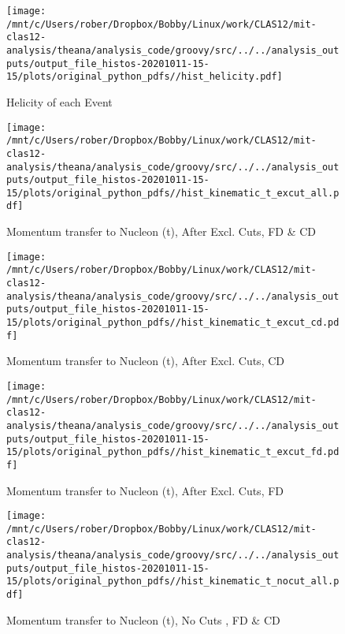 \documentclass{article}
\begin{document}
\begin{landscape}
    \begin{figure}[h]
        \centering

        \texttt{[image: /mnt/c/Users/rober/Dropbox/Bobby/Linux/work/CLAS12/mit-clas12-analysis/theana/analysis\_code/groovy/src/../../analysis\_outputs/output\_file\_histos-20201011-15-15/plots/original\_python\_pdfs//hist\_helicity.pdf]}
        \captionsetup{textformat=empty,labelformat=blank}
        \caption{Helicity of each Event}
    \end{figure}
    \clearpage
    
    \begin{figure}[h]
        \centering

        \texttt{[image: /mnt/c/Users/rober/Dropbox/Bobby/Linux/work/CLAS12/mit-clas12-analysis/theana/analysis\_code/groovy/src/../../analysis\_outputs/output\_file\_histos-20201011-15-15/plots/original\_python\_pdfs//hist\_kinematic\_t\_excut\_all.pdf]}
        \captionsetup{textformat=empty,labelformat=blank}
        \caption{Momentum transfer to Nucleon (t), After Excl. Cuts, FD \& CD}
    \end{figure}
    \clearpage
    
    \begin{figure}[h]
        \centering

        \texttt{[image: /mnt/c/Users/rober/Dropbox/Bobby/Linux/work/CLAS12/mit-clas12-analysis/theana/analysis\_code/groovy/src/../../analysis\_outputs/output\_file\_histos-20201011-15-15/plots/original\_python\_pdfs//hist\_kinematic\_t\_excut\_cd.pdf]}
        \captionsetup{textformat=empty,labelformat=blank}
        \caption{Momentum transfer to Nucleon (t), After Excl. Cuts, CD}
    \end{figure}
    \clearpage
    
    \begin{figure}[h]
        \centering

        \texttt{[image: /mnt/c/Users/rober/Dropbox/Bobby/Linux/work/CLAS12/mit-clas12-analysis/theana/analysis\_code/groovy/src/../../analysis\_outputs/output\_file\_histos-20201011-15-15/plots/original\_python\_pdfs//hist\_kinematic\_t\_excut\_fd.pdf]}
        \captionsetup{textformat=empty,labelformat=blank}
        \caption{Momentum transfer to Nucleon (t), After Excl. Cuts, FD}
    \end{figure}
    \clearpage
    
    \begin{figure}[h]
        \centering

        \texttt{[image: /mnt/c/Users/rober/Dropbox/Bobby/Linux/work/CLAS12/mit-clas12-analysis/theana/analysis\_code/groovy/src/../../analysis\_outputs/output\_file\_histos-20201011-15-15/plots/original\_python\_pdfs//hist\_kinematic\_t\_nocut\_all.pdf]}
        \captionsetup{textformat=empty,labelformat=blank}
        \caption{Momentum transfer to Nucleon (t), No Cuts , FD \& CD}
    \end{figure}
    \clearpage
    

\end{landscape}
\end{document}
